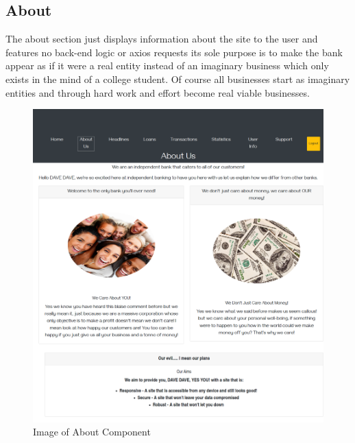 \subsection{About}
The about section just displays information about the site to the user and features no back-end logic or axios requests
its sole purpose is to make the bank appear as if it were a real entity instead of an imaginary business which only
exists in the mind of a college student.  Of course all businesses start as imaginary entities and through hard work
and effort become real viable businesses.
\begin{figure}[H]
\includegraphics[width=\textwidth]{img/aboutcomponent.png}
\caption{Image of About Component}
\label{fig:Image of about component}
\end{figure}
